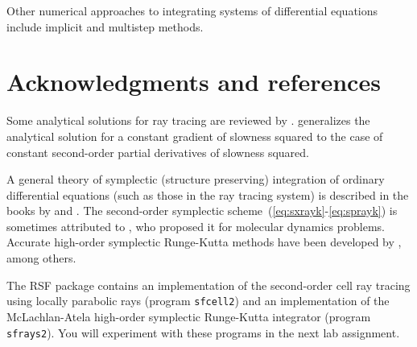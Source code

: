 \documentclass[12pt]{handout}
\begin{document}
Other numerical approaches to integrating systems of differential
equations include implicit and multistep methods.




\section{Acknowledgments and references}

Some analytical solutions for ray tracing are reviewed by
\cite{cerveny}.  \cite{kornig} generalizes the analytical solution for
a constant gradient of slowness squared to the case of constant
second-order partial derivatives of slowness squared. 

A general theory of symplectic (structure preserving) integration of
ordinary differential equations (such as those in the ray tracing
system) is described in the books by \cite{serna} and
\cite{symplectic}. The second-order symplectic
scheme~(\ref{eq:sxrayk}-\ref{eq:sprayk}) is sometimes attributed to
\cite{verlet}, who proposed it for molecular dynamics
problems. Accurate high-order symplectic Runge-Kutta methods have been
developed by \cite{atela}, among others.

The RSF package contains an implementation of the second-order cell
ray tracing using locally parabolic rays (program \texttt{sfcell2})
and an implementation of the McLachlan-Atela high-order symplectic
Runge-Kutta integrator (program \texttt{sfrays2}). You will experiment
with these programs in the next lab assignment.



\end{document}
